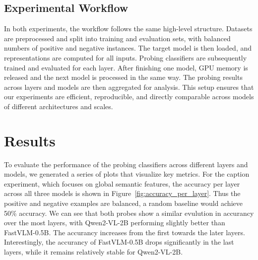 \documentclass[11pt]{article}
\begin{document}
\subsection{Experimental Workflow}
In both experiments, the workflow follows the same high-level structure.
Datasets are preprocessed and split into training and evaluation sets, with
balanced numbers of positive and negative instances. The target model is then
loaded, and representations are computed for all inputs. Probing classifiers are subsequently trained
and evaluated for each layer. After finishing one model, GPU memory is released
and the next model is processed in the same way. The probing results across
layers and models are then aggregated for analysis. This setup ensures that
our experiments are efficient, reproducible, and directly comparable across
models of different architectures and scales.


\section{Results}
To evaluate the performance of the probing classifiers across different layers
and models, we generated a series of plots that visualize key metrics.
For the caption experiment, which focuses on global semantic features, the accuracy per layer
across all three models is shown in Figure~\ref{fig:accuracy_per_layer}.
Thus the positive and negative examples are balanced, a random baseline would achieve 50\% accuracy.
We can see that both probes show a similar evulution in accurancy over the most layers, with Qwen2-VL-2B performing slightly better than FastVLM-0.5B.
The accurancy increases from the first towards the later layers.
Interestingly, the accurancy of FastVLM-0.5B drops significantly in the last layers, while it remains relatively stable for Qwen2-VL-2B.
\end{document}
